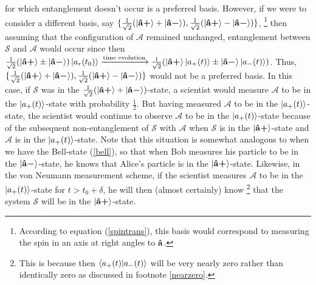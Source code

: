 \documentclass[letter, 12pt]{turabian-thesis}
\theoremstyle{hypothesis}
\newcommand{\uvb}[1]{\vb{\hat{{#1}}}}
\newcommand{\uvbp}[1]{\uvb{#1}\bm{+}}
\newcommand{\uvbm}[1]{\uvb{#1}\bm{-}}
\let\origfootnote\footnote %
\renewcommand{\footnote}[1]{%
\noindent %
\origfootnote{#1}}
\begin{document}
for which entanglement doesn't occur is a preferred basis. However, if we were to consider a different basis, say $\{\frac{1}{\sqrt{2}}(\ket{\uvbp{a}}+\ket{\uvbm{a}}), \frac{1}{\sqrt{2}}(\ket{\uvbp{a}}-\ket{\uvbm{a}})\}$,\footnote{According to equation (\ref{spintrans}), this basis would correspond to measuring the spin in an axis at right angles to 
$\uvb{a}$.} then assuming that the configuration of $\mathcal{A}$ remained unchanged, entanglement between $\mathcal{S}$ and $\mathcal{A}$ would occur since then 
$\frac{1}{\sqrt{2}}(\ket{\uvbp{a}}\pm\ket{\uvbm{a}})\ket{a_r(t_0)}\xrightarrow{\text{time evolution}}\frac{1}{\sqrt{2}}(\ket{\uvbp{a}}\ket{a_+(t)}\pm\ket{\uvbm{a}}\ket{a_-(t)})$. Thus, $\{\frac{1}{\sqrt{2}}(\ket{\uvbp{a}}+\ket{\uvbm{a}}), \frac{1}{\sqrt{2}}(\ket{\uvbp{a}}-\ket{\uvbm{a}})\}$ would not be a preferred basis. In this case, if  $\mathcal{S}$ was in the $\frac{1}{\sqrt{2}}(\ket{\uvbp{a}}+\ket{\uvbm{a}})$-state, a scientist would measure $\mathcal{A}$ to be in the $\ket{a_+(t)}$-state with probability $\frac{1}{2}$. But having measured $\mathcal{A}$ to be in the $\ket{a_+(t)}$-state, the scientist would continue to observe $\mathcal{A}$ to be in the $\ket{a_+(t)}$-state because of the subsequent non-entanglement of $\mathcal{S}$ with $\mathcal{A}$ when $\mathcal{S}$ is in the   $\ket{\uvbp{a}}$-state and $\mathcal{A}$ is in the $\ket{a_+(t)}$-state. Note that this situation is somewhat analogous to when we have the Bell-state (\ref{bell}), so that when Bob measures his particle to be in the $\ket{\uvbm{a}}$-state, he knows that Alice's particle is in the $\ket{\uvbp{a}}$-state. Likewise, in the von Neumann measurement scheme, if the scientist measures $\mathcal{A}$ to be in the $\ket{a_+(t)}$-state for $t>t_0+\delta$, he will then (almost certainly) know\footnote{This is because then $\ip{a_+(t)}{a_-(t)}$ will be very nearly zero rather than identically zero as discussed in footnote \ref{nearzero}.} that the system $\mathcal{S}$ will be in the $\ket{\uvbp{a}}$-state.
\end{document}
